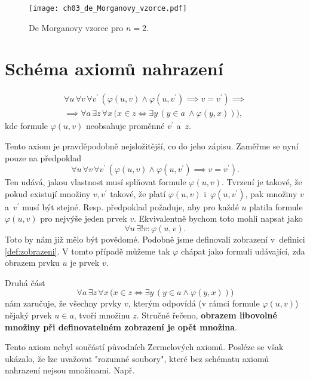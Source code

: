 \begin{figure}[H]
	\centering
	\texttt{[image: ch03\_de\_Morganovy\_vzorce.pdf]}
    \caption{De Morganovy vzorce pro $n=2$.}
    \label{fig:de_morgan}
\end{figure}

\section{Schéma axiomů nahrazení}\label{sec:schema_axiomu_nahrazeni}
\begin{align*}
    \forall u\,\forall v\,\forall v^\prime\,(\varphi(u,v) \land \varphi(u,v^\prime) \implies v=v^\prime)\implies\\ \implies \forall a\,\exists z\,\forall x\,\bigl(x\in z \iff \exists y\,(y\in a~\land \varphi(y,x))\bigr),
\end{align*}
kde formule $\varphi(u,v)$ neobsahuje proměnné $v^\prime$ a~$z$.\par
Tento axiom je pravděpodobně nejsložitější, co do jeho zápisu. Zaměřme se nyní pouze na předpoklad
\begin{equation*}
    \forall u\,\forall v\,\forall v^\prime\,(\varphi(u,v) \land \varphi(u,v^\prime) \implies v=v^\prime).
\end{equation*}
Ten udává, jakou vlastnost musí splňovat formule $\varphi(u,v)$. Tvrzení je takové, že pokud existují množiny $v,v^\prime$ takové, že platí $\varphi(u,v)$ i~$\varphi(u,v^\prime)$, pak množiny $v$ a~$v^\prime$ musí být stejné. Resp. předpoklad požaduje, aby pro každé $u$ platila formule $\varphi(u,v)$ pro nejvýše jeden prvek $v$. Ekvivalentně bychom toto mohli napsat jako
\begin{equation*}
    \forall u\,\exists! v: \varphi(u,v).
\end{equation*}
Toto by nám již mělo být povědomé. Podobně jsme definovali zobrazení v~definici \ref{def:zobrazeni}. V tomto případě můžeme tak $\varphi$ chápat jako formuli udávající, zda obrazem prvku $u$ je prvek $v$.\par
Druhá část
\begin{equation*}
    \forall a\,\exists z\,\forall x\,\bigl(x\in z \iff \exists y\,(y\in a \land \varphi(y,x))\bigr)
\end{equation*}
nám zaručuje, že všechny prvky $v$, kterým odpovídá (v rámci formule $\varphi(u,v)$) nějaký prvek $u\in a$, tvoří množinu $z$. Stručně řečeno, \textbf{obrazem libovolné množiny při definovatelném zobrazení je opět množina}.\par
Tento axiom nebyl součástí původních Zermelových axiomů. Posléze se však ukázalo, že lze uvažovat "rozumné soubory", které bez schématu axiomů nahrazení nejsou množinami. Např.
